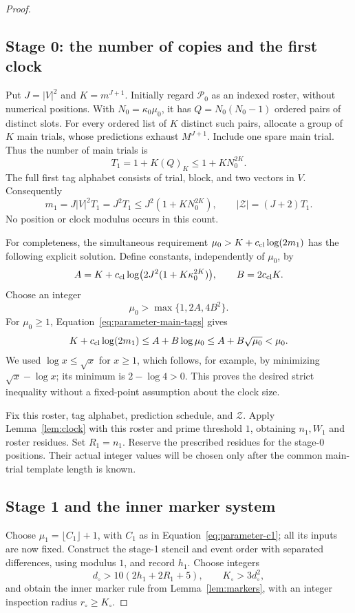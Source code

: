 \begin{proof}
\subsection*{Stage 0: the number of copies and the first clock}
Put \(J=|V|^2\) and \(K=m^{J+1}\).  Initially regard \(\mathcal P_0\)
as an indexed roster, without numerical positions.  With
\(N_0=\kappa_0\mu_0\), it has \(Q=N_0(N_0-1)\) ordered pairs of
distinct slots.  For every ordered list of \(K\) distinct such pairs,
allocate a group of \(K\) main trials, whose predictions exhaust
\(M^{J+1}\).  Include one spare main trial.  Thus the number of main
trials is
\[
 T_1=1+K(Q)_K\le1+KN_0^{2K}.
\]
The full first tag alphabet consists of trial, block, and two vectors
in \(V\).  Consequently
\begin{equation}\label{eq:parameter-main-tags}
 m_1=J|V|^2T_1=J^2T_1
       \le J^2(1+KN_0^{2K}),
 \qquad |\mathcal Z|=(J+2)T_1.
\end{equation}
No position or clock modulus occurs in this count.

For completeness, the simultaneous requirement
\(\mu_0>K+c_{\rm cl}\log(2m_1)\) has the following explicit solution.
Define constants, independently of \(\mu_0\), by
\[
 A=K+c_{\rm cl}\log\bigl(2J^2(1+K\kappa_0^{2K})\bigr),
 \qquad B=2c_{\rm cl}K.
\]
Choose an integer
\begin{equation}\label{eq:parameter-copy0}
 \mu_0>\max\{1,2A,4B^2\}.
\end{equation}
For \(\mu_0\ge1\), Equation~\eqref{eq:parameter-main-tags} gives
\[
 K+c_{\rm cl}\log(2m_1)
 \le A+B\log\mu_0
 \le A+B\sqrt{\mu_0}<\mu_0.
\]
We used \(\log x\le\sqrt x\) for \(x\ge1\), which follows, for
example, by minimizing \(\sqrt x-\log x\); its minimum is
\(2-\log4>0\).  This proves the desired strict inequality without a
fixed-point assumption about the clock size.

Fix this roster, tag alphabet, prediction schedule, and
\(\mathcal Z\).  Apply Lemma~\ref{lem:clock} with this roster and
prime threshold \(1\), obtaining \(n_1,W_1\) and roster residues.
Set \(R_1=n_1\).  Reserve the prescribed residues for the stage-0
positions.  Their actual integer values will be chosen only after
the common main-trial template length is known.

\subsection*{Stage 1 and the inner marker system}
Choose
\(\mu_1=\lfloor C_1\rfloor+1\), with \(C_1\) as in
Equation~\eqref{eq:parameter-c1}; all its inputs are now fixed.  Construct
the stage-1 stencil and event order with separated differences, using
modulus \(1\), and record \(h_1\).  Choose integers
\begin{equation}\label{eq:parameter-inner-marker}
 d_\circ>10(2h_1+2R_1+5),
 \qquad K_\circ>3d_\circ^2,
\end{equation}
and obtain the inner marker rule from Lemma~\ref{lem:markers}, with
an integer inspection radius \(r_\circ\ge K_\circ\).


\end{proof}
